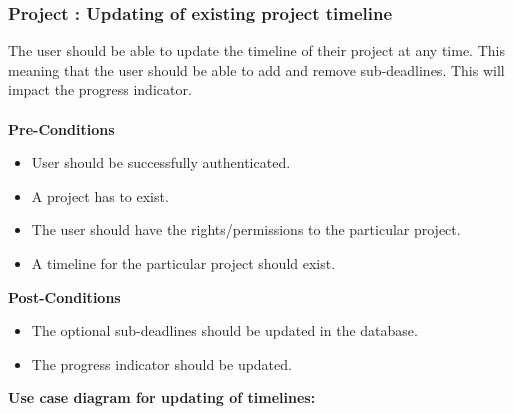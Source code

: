 \subsubsection{Project : Updating of existing project timeline}
The user should be able to update the timeline of their project at any time. This meaning that the user should be able to add and remove sub-deadlines. This will impact the progress indicator.\\ \\
\textbf{Pre-Conditions}
\begin{itemize}
	\item User should be successfully authenticated.
	\item A project has to exist.
	\item The user should have the rights/permissions to the particular project.
	\item A timeline for the particular project should exist.\\
\end{itemize}
\textbf{Post-Conditions}
\begin{itemize}
	\item The optional sub-deadlines should be updated in the database.
	\item The progress indicator should be updated.\\
\end{itemize}
\pagebreak
\textbf{Use case diagram for updating of timelines: }\\
\centerline{}

